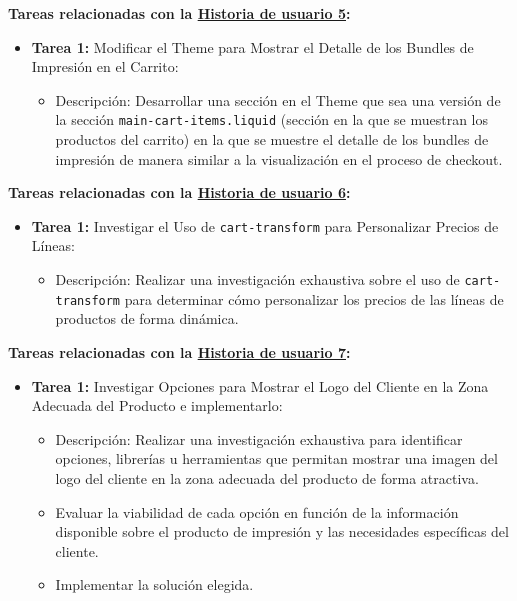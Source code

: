 \documentclass[12pt]{article}
\begin{document}
\textbf{Tareas relacionadas con la \hyperref[sec:historia5]{Historia de usuario 5}:}
\begin{itemize}
    \item \textbf{Tarea 1:} Modificar el Theme para Mostrar el Detalle de los Bundles de Impresión en el Carrito:
          \begin{itemize}[label=--]
              \item Descripción: Desarrollar una sección en el Theme que sea una versión de la sección \texttt{main-cart-items.liquid} (sección en la que se muestran los productos del carrito) en la que se muestre el detalle de los bundles de impresión de manera similar a la visualización en el proceso de checkout.
          \end{itemize}
\end{itemize}

\textbf{Tareas relacionadas con la \hyperref[sec:historia6]{Historia de usuario 6}:}
\begin{itemize}
    \item \textbf{Tarea 1:} Investigar el Uso de \texttt{cart-transform} para Personalizar Precios de Líneas:
          \begin{itemize}[label=--]
              \item Descripción: Realizar una investigación exhaustiva sobre el uso de \texttt{cart-transform} para determinar cómo personalizar los precios de las líneas de productos de forma dinámica.
          \end{itemize}
\end{itemize}

\textbf{Tareas relacionadas con la \hyperref[sec:historia7]{Historia de usuario 7}:}
\begin{itemize}
    \item \textbf{Tarea 1:} Investigar Opciones para Mostrar el Logo del Cliente en la Zona Adecuada del Producto e implementarlo:
          \begin{itemize}[label=--]
              \item Descripción: Realizar una investigación exhaustiva para identificar opciones, librerías u herramientas que permitan mostrar una imagen del logo del cliente en la zona adecuada del producto de forma atractiva.
              \item Evaluar la viabilidad de cada opción en función de la información disponible sobre el producto de impresión y las necesidades específicas del cliente.
              \item Implementar la solución elegida.
          \end{itemize}
\end{itemize}
\end{document}
